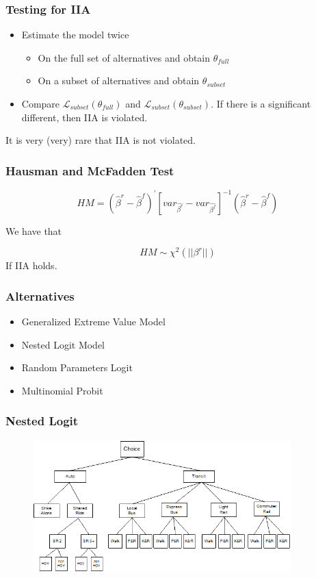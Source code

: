 \documentclass{beamer}
\newcommand{\Lik}{\mathcal{L}}
\newcommand{\1}{\mathbb{1}}
\begin{document}
\begin{frame}\frametitle{Testing for IIA}
\begin{itemize}
 \item Estimate the model twice 
 \begin{itemize}
  \item On the full set of alternatives and obtain $\theta_{full}$ 
  \item On a subset of alternatives and obtain $\theta_{subset}$
 \end{itemize}
\item  Compare $\Lik_{subset}(\theta_{full})$ and $\Lik_{subset}(\theta_{subset})$. If there is a significant different, then IIA is violated.
\end{itemize}
It is very (very) rare that IIA is not violated.
\end{frame}

\begin{frame}\frametitle{Hausman and McFadden Test}

\begin{equation}
 HM = (\hat{\beta}^r - \hat{\beta}^f)^{'}
[var_{\hat{\beta^r}} - var_{\hat{\beta^f}}]^{-1}
 (\hat{\beta}^r - \hat{\beta}^f)
\end{equation}

We have that 

\begin{equation}
 HM \sim \chi^2(|| \beta^r ||)
\end{equation}
 If IIA holds. 
\end{frame}


\begin{frame}\frametitle{Alternatives}
\begin{itemize}
 \item Generalized Extreme Value Model
 \item Nested Logit Model
 \item Random Parameters Logit
 \item Multinomial Probit 
\end{itemize}
\end{frame}

\begin{frame}\frametitle{Nested Logit}
\begin{figure}
\includegraphics[width = 10cm]{choice}
\end{figure}
\end{frame}
\end{document}
